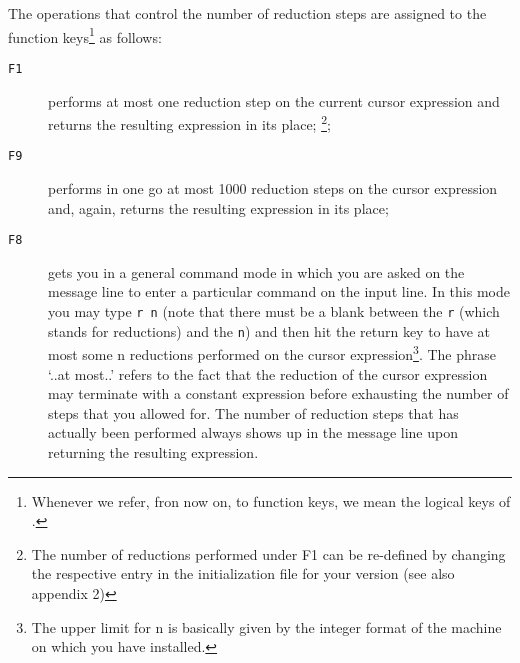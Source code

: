 The operations that control the number of {\mys reduction steps}
are assigned to the function keys\footnote{Whenever we refer, 
fron now on, to function keys, we mean the logical keys of \pired.}
 as follows:
\begin{description}
\item[{\tt F1}] performs at most one reduction step on the current cursor expression
and returns the resulting expression in its place;
\footnote{The number of reductions performed under F1 can be re-defined by changing the
respective entry in the initialization file for your \pired version (see also
appendix 2)};
\item[{\tt F9}] performs in one go at most 1000 reduction steps on the cursor
expression and, again, returns the resulting expression in its place;
\item[{\tt F8}] gets you in a general {\mys command mode} in which you are asked on the
message line to enter a particular command on the input line. In this mode
you may type {\tt r n} (note that there must be a blank between
the {\tt r} (which stands for reductions) and the {\tt n}) 
and then hit the return key
to have at most some n reductions performed on the cursor expression\footnote{The upper limit for n is basically given by the integer format 
 of the machine on which you have \pired installed.}. 
The phrase `..at most..' refers to the fact that the reduction of the
cursor expression may terminate with a
constant expression
before exhausting the number of steps
that you allowed for. The number of reduction steps that has actually been
performed always shows up in the message line upon returning the resulting
expression.
\end{description}


